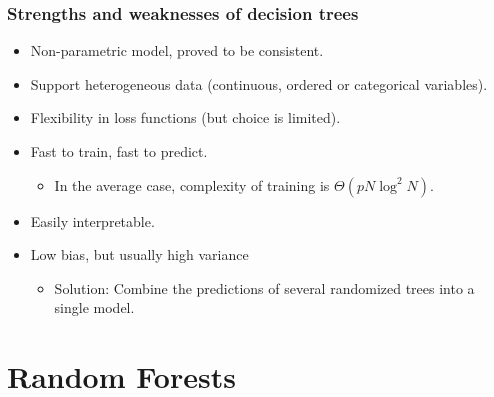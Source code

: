 \documentclass{beamer}
\begin{document}
\begin{frame}
  \frametitle{Strengths and weaknesses of decision trees}

  \begin{itemize}
    \item {\color{blue} Non-parametric} model, proved to be
          {\color{blue} consistent}.

    \vspace{0.25cm}

    \item Support {\color{blue} heterogeneous} data (continuous, ordered or
          categorical variables).

    \vspace{0.25cm}

    \item {\color{blue}Flexibility} in loss functions (but choice is
          {\color{red}limited}).

    \vspace{0.25cm}

    \item {\color{blue} Fast} to train, {\color{blue} fast} to predict.
        \begin{itemize}
            \item In the average case, complexity of training is $\Theta(pN\log^2 N)$.
        \end{itemize}

    \vspace{0.25cm}

    \item Easily {\color{blue} interpretable}.

    \vspace{0.25cm}

    \item {\color{blue} Low bias}, but usually {\color{red} high variance}\\
        \begin{itemize}
            \item Solution: Combine the predictions of several randomized
                  trees into a single model.
        \end{itemize}
  \end{itemize}
\end{frame}



\section{Random Forests}
\end{document}
